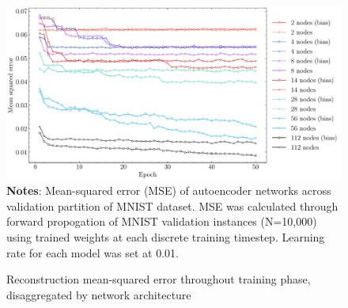 \begin{figure}
    \caption{Reconstruction mean-squared error throughout training phase, disaggregated by network architecture}
	\label{fig:training-loss}
	\includegraphics[width=1.0\textwidth]{graphics/model_loss.pdf}
    \textbf{Notes}: Mean-squared error (MSE) of autoencoder networks across validation partition of MNIST dataset. MSE was calculated through forward propogation of MNIST validation instances (N=10,000) using trained weights at each discrete training timestep. Learning rate for each model was set at 0.01.
\end{figure}